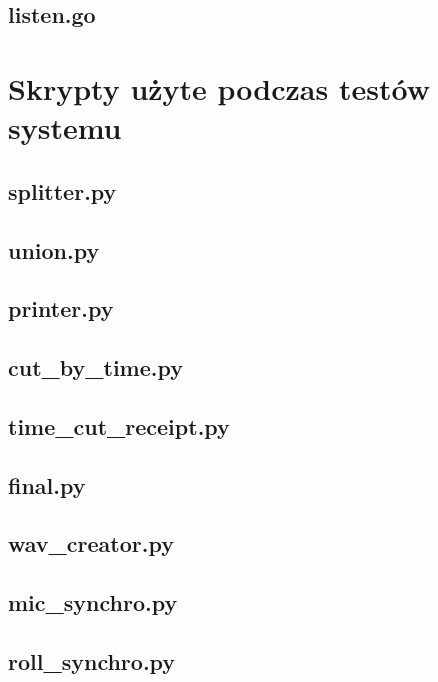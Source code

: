 \documentclass[12pt,oneside,a4paper]{book}
\theoremstyle{break}
\begin{document}
\section{listen.go}\label{listen.go}

\chapter{Skrypty użyte podczas testów systemu} \label{test-code}

\section{splitter.py}\label{splitter.py}

\section{union.py}\label{union.py}

\section{printer.py}\label{printer.py}

\section{cut\_by\_time.py}\label{cut_by_time.py}

\section{time\_cut\_receipt.py}\label{time_cut_receipt.py}

\section{final.py}\label{final.py}

\section{wav\_creator.py}\label{wav_creator.py}

\section{mic\_synchro.py}\label{mic-synchro-script}

\section{roll\_synchro.py}\label{roll-synchro-script}
\end{document}
